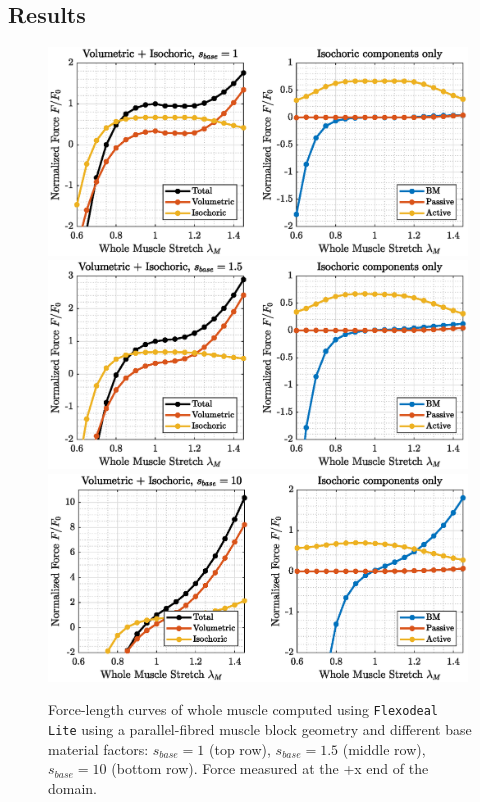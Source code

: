 \documentclass{sfuthesis}
\numberwithin{equation}{section}
\numberwithin{figure}{chapter}
\numberwithin{table}{chapter}
\theoremstyle{definition}
\begin{document}
\subsection{Results}

\begin{figure}
    \centering
    \includegraphics[width=0.99\textwidth]{fl_curve_flexodeal_lite_bm_1.eps}\\[1em]
    \includegraphics[width=0.99\textwidth]{fl_curve_flexodeal_lite_bm_1.5.eps}\\[1em]
    \includegraphics[width=0.99\textwidth]{fl_curve_flexodeal_lite_bm_10.eps}
    \caption{Force-length curves of whole muscle computed using \texttt{Flexodeal Lite} using a parallel-fibred muscle block geometry and different base material factors: $s_{base}=1$ (top row), $s_{base}=1.5$ (middle row), $s_{base}=10$ (bottom row). Force measured at the +x end of the domain.\label{fig:fl-curves-block}}
\end{figure}
\end{document}
